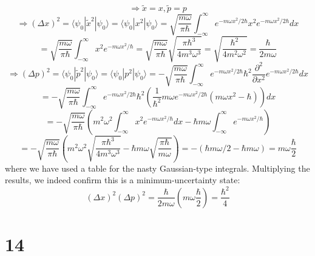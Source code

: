 \documentclass{article}
\begin{document}
\[
  \Rightarrow \tilde{x}=x, \tilde{p}=p
\]
\[
  \Rightarrow (\Delta x)^{2}=\langle \psi_{0}|\tilde{x}^{2}|\psi_{0} \rangle=\langle \psi_{0}|x^{2}|\psi_{0} \rangle
  =\sqrt{\frac{m\omega}{\pi\hbar}}\int_{-\infty}^{\infty}e^{-m\omega x^{2}/2\hbar}x^{2}e^{-m\omega x^{2}/2\hbar}dx
\]
\[
  =\sqrt{\frac{m\omega}{\pi\hbar}}\int_{-\infty}^{\infty}x^{2}e^{-m\omega x^{2}/\hbar}
  =\sqrt{\frac{m\omega}{\pi\hbar}}\sqrt{\frac{\pi\hbar^{3}}{4m^{3}\omega^{3}}}
  =\sqrt{\frac{\hbar^{2}}{4m^{2}\omega^{2}}}=\frac{\hbar}{2m\omega}
\]
\[
  \Rightarrow (\Delta p)^{2}=\langle \psi_{0}|\tilde{p}^{2}|\psi_{0} \rangle=\langle \psi_{0}|p^{2}|\psi_{0} \rangle
  =-\sqrt{\frac{m\omega}{\pi\hbar}}\int_{-\infty}^{\infty}e^{-m\omega x^{2}/2\hbar}\hbar^{2}\frac{\partial^{2}}{\partial x^{2}}
  e^{-m\omega x^{2}/2\hbar}dx
\]
\[
  =-\sqrt{\frac{m\omega}{\pi\hbar}}\int_{-\infty}^{\infty}e^{-m\omega x^{2}/2\hbar}
  \hbar^{2}\left( \frac{1}{\hbar^{2}} m\omega e^{-m\omega x^{2}/2\hbar}(m\omega x^{2}-\hbar)\right)dx
\]
\[
  =-\sqrt{\frac{m\omega}{\pi\hbar}}\left( m^{2}\omega^{2}\int_{-\infty}^{\infty}x^{2}e^{-m\omega x^{2}/\hbar}dx
    -\hbar m\omega\int_{-\infty}^{\infty}e^{-m\omega x^{2}/\hbar}\right)
\]
\[
  =-\sqrt{\frac{m\omega}{\pi\hbar}}\left( m^{2}\omega^{2}\sqrt{\frac{\pi \hbar^{3}}{4m^{3}\omega^{3}}}
    -\hbar m\omega\sqrt{\frac{\pi\hbar}{m\omega}} \right)
  =-(\hbar m\omega/2-\hbar m\omega)=m\omega\frac{\hbar}{2}
\]
where we have used a table for the nasty Gaussian-type integrals.
Multiplying the results, we indeed confirm this is a minimum-uncertainty state:
\[
  (\Delta x)^{2}(\Delta p)^{2}=\frac{\hbar}{2m\omega}\left( m\omega\frac{\hbar}{2}\right)=\frac{\hbar^{2}}{4}
\]

\section*{14}
\end{document}
